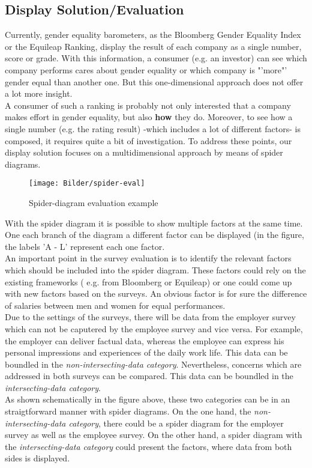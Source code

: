\documentclass[portrait,a4paper]{article}
\begin{document}
	\subsection{Display Solution/Evaluation}
		Currently, gender equality barometers, as the Bloomberg Gender Equality Index or the Equileap Ranking, 
		display the result of each company as a single number, score or grade. With this information, 
		a consumer (e.g. an investor) can see which company performs cares about gender equality or which 
		company is "'more"' gender equal than another one. But this one-dimensional approach does not offer 
		a lot more insight.\\
		A consumer of such a ranking is probably not only interested that a company makes effort 
		in gender equality, but also \textbf{how} they do.
		Moreover, to see how a single number (e.g. the rating result) -which includes a lot of different factors- is composed, 
		it requires quite a bit of investigation.
		To address these points, our display solution focuses on a multidimensional approach by means of spider diagrams.
		\begin{figure}[H]
			\texttt{[image: Bilder/spider-eval]}
			\caption{Spider-diagram evaluation example}
			\label{Spider_diagram_evaluation__}
		\end{figure}

		With the spider diagram it is possible to show multiple factors at the same time. One each branch of the 
		diagram a different factor can be displayed (in the figure, the labels 'A - L' represent each one factor.\\
		An important point in the survey evaluation is to identify the relevant factors which should be included 
		into the spider diagram. These factors could rely on the existing frameworks ( e.g. from Bloomberg or Equileap) 
		or one could come up with new factors based on the surveys. An obvious factor is for sure the 
		difference of salaries between men and women for equal performances.\\
 
		Due to the settings of the surveys, there will be data from the employer survey which can not be caputered 
		by the employee survey and vice versa. For example, the employer can deliver factual data, whereas the 
		employee can express his personal impressions and experiences of the daily work life. 
		This data can be boundled in the \textit{non-intersecting-data category}. Nevertheless, concerns 
		which are addressed in both surveys can be compared. This data can be boundled in the \textit{intersecting-data category}.\\
		As shown schematically in the figure above, these two categories can be in an straigtforward 
		manner with spider diagrams. On the one hand, the \textit{non-intersecting-data category}, there could 
		be a spider diagram for the employer survey as well as the employee survey. 
		On the other hand, a spider diagram with the \textit{intersecting-data category} 
		could present the factors, where data from both sides is displayed.\\
\end{document}
